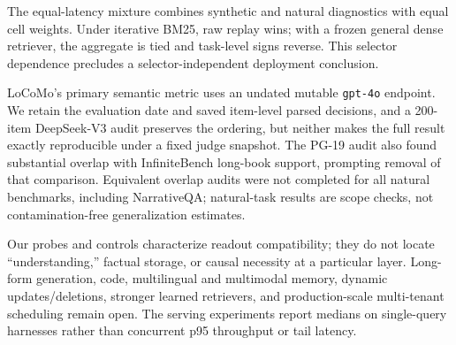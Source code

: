The equal-latency mixture combines synthetic and natural diagnostics with equal
cell weights. Under iterative BM25, raw replay wins; with a frozen general
dense retriever, the aggregate is tied and task-level signs reverse. This
selector dependence precludes a selector-independent deployment conclusion.

LoCoMo's primary semantic metric uses an undated mutable \texttt{gpt-4o}
endpoint. We retain the evaluation date and saved item-level parsed decisions,
and a 200-item DeepSeek-V3 audit preserves the ordering, but neither makes the
full result exactly reproducible under a fixed judge snapshot. The PG-19 audit
also found substantial overlap with InfiniteBench long-book support, prompting
removal of that comparison. Equivalent overlap audits were not completed for
all natural benchmarks, including NarrativeQA; natural-task results are scope
checks, not contamination-free generalization estimates.

Our probes and controls characterize readout compatibility; they do not locate
``understanding,'' factual storage, or causal necessity at a particular layer.
Long-form generation, code, multilingual and multimodal memory, dynamic
updates/deletions, stronger learned retrievers, and production-scale
multi-tenant scheduling remain open. The serving experiments report medians on
single-query harnesses rather than concurrent p95 throughput or tail latency.
